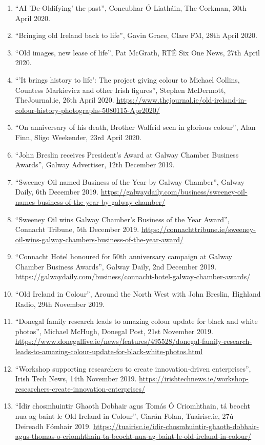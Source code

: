 \documentclass[10pt,a4paper]{res} %
\begin{document}
\begin{resume}
{\begin{enumerate}
\item ``AI 'De-Oldifying' the past'', Concubhar \'{O} Liath\'{a}in, The Corkman, 30th April 2020.
\item ``Bringing old Ireland back to life'', Gavin Grace, Clare FM, 28th April 2020.
\item ``Old images, new lease of life'', Pat McGrath, RT\'{E} Six One News, 27th April 2020.
\item ``'It brings history to life': The project giving colour to Michael Collins, Countess Markievicz and other Irish figures'', Stephen McDermott, TheJournal.ie, 26th April 2020. \url{https://www.thejournal.ie/old-ireland-in-colour-history-photographs-5080115-Apr2020/}
\item ``On anniversary of his death, Brother Walfrid seen in glorious colour'', Alan Finn, Sligo Weekender, 23rd April 2020.
\item ``John Breslin receives President's Award at Galway Chamber Business Awards'', Galway Advertiser, 12th December 2019.
\item ``Sweeney Oil named Business of the Year by Galway Chamber'', Galway Daily, 6th December 2019. \url{https://galwaydaily.com/business/sweeney-oil-names-business-of-the-year-by-galway-chamber/}
\item ``Sweeney Oil wins Galway Chamber's Business of the Year Award'', Connacht Tribune, 5th December 2019. \url{https://connachttribune.ie/sweeney-oil-wins-galway-chambers-business-of-the-year-award/}
\item ``Connacht Hotel honoured for 50th anniversary campaign at Galway Chamber Business Awards'', Galway Daily, 2nd December 2019. \url{https://galwaydaily.com/business/connacht-hotel-galway-chamber-awards/}
\item ``Old Ireland in Colour'', Around the North West with John Breslin, Highland Radio, 29th November 2019.
\item ``Donegal family research leads to amazing colour update for black and white photos'', Michael McHugh, Donegal Post, 21st November 2019. \url{https://www.donegallive.ie/news/features/495528/donegal-family-research-leads-to-amazing-colour-update-for-black-white-photos.html}
\item ``Workshop supporting researchers to create innovation-driven enterprises'', Irish Tech News, 14th November 2019. \url{https://irishtechnews.ie/workshop-researchers-create-innovation-enterprises/}
\item ``Idir chosmhuintir Ghaoth Dobhair agus Tom\'{a}s \'{O} Criomhthain, t\'{a} beocht nua ag baint le Old Ireland in Colour'', Ciar\'{a}n Folan, Tuairisc.ie, 27\'{u} Deireadh F\'{o}mhair 2019. \url{https://tuairisc.ie/idir-chosmhuintir-ghaoth-dobhair-agus-thomas-o-criomhthain-ta-beocht-nua-ag-baint-le-old-ireland-in-colour/}

\end{enumerate}}
\end{resume}
\end{document}
